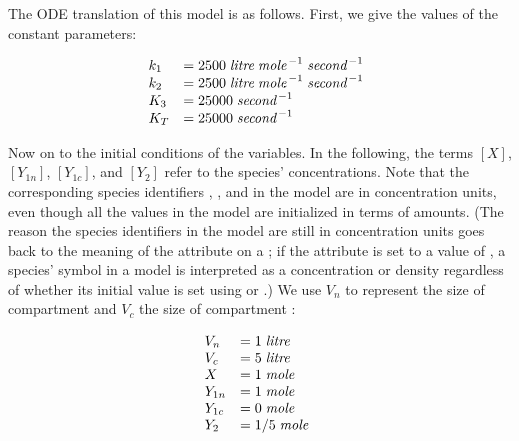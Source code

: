 
The ODE translation of this model is as follows.  First, we give
the values of the constant parameters:
\begin{linenomath}
  \begin{equation*}
    \begin{array}{@{}lll@{}}
      k_1   & = 2500\; \emph{litre} \; \emph{mole}^{\,-1}\; \emph{second}^{\,-1}\\
      k_2   & = 2500\; \emph{litre} \; \emph{mole}^{\,-1}\; \emph{second}^{\,-1}\\
      K_3   & = 25000\; \emph{second}^{\,-1}\\
      K_T   & = 25000\; \emph{second}^{\,-1}\\
    \end{array}
  \end{equation*}
\end{linenomath}
Now on to the initial conditions of the variables.  In the
following, the terms $[X]$, $[Y_{1n}]$, $[Y_{1c}]$, and $[Y_2]$
refer to the species' concentrations.  Note that the corresponding
species identifiers , , 
and  in the model are in concentration units, even
though all the values in the model are initialized in terms of
amounts.  (The reason the species identifiers in the model are
still in concentration units goes back to the meaning of the
 attribute on a \Species; if the
attribute is set to a value of , a species' symbol in a
model is interpreted as a concentration or density regardless of
whether its initial value is set using  or
.)  We use $V_n$ to represent the size
of compartment  and $V_c$ the size of compartment
:
\begin{linenomath}
  \begin{equation*}
    \begin{array}{@{}lll@{}}
      V_n    & = 1\; \emph{litre}\\
      V_c    & = 5\; \emph{litre}\\
      X      & = 1\; \emph{mole}\\
      Y_{1n} & = 1\; \emph{mole}\\
      Y_{1c} & = 0\; \emph{mole}\\
      Y_2    & = 1/5\; \emph{mole}\\
    \end{array}
  \end{equation*}
\end{linenomath}
